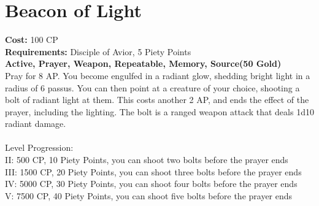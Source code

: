 \section{Beacon of Light}
\textbf{Cost:} 100 CP\\
\textbf{Requirements:} Disciple of Avior, 5 Piety Points \\
\textbf{Active, Prayer, Weapon, Repeatable, Memory, Source(50 Gold)}\\
Pray for 8 AP. You become engulfed in a radiant glow, shedding bright light in a radius of 6 passus. You can then point at a creature of your choice, shooting a bolt of radiant light at them. This costs another 2 AP, and ends the effect of the prayer, including the lighting. The bolt is a ranged weapon attack that deals 1d10 radiant damage.\\
\\
Level Progression:\\
II: 500 CP, 10 Piety Points, you can shoot two bolts before the prayer ends\\
III: 1500 CP, 20 Piety Points, you can shoot three bolts before the prayer ends\\
IV: 5000 CP, 30 Piety Points, you can shoot four bolts before the prayer ends\\
V: 7500 CP, 40 Piety Points, you can shoot five bolts before the prayer ends\\